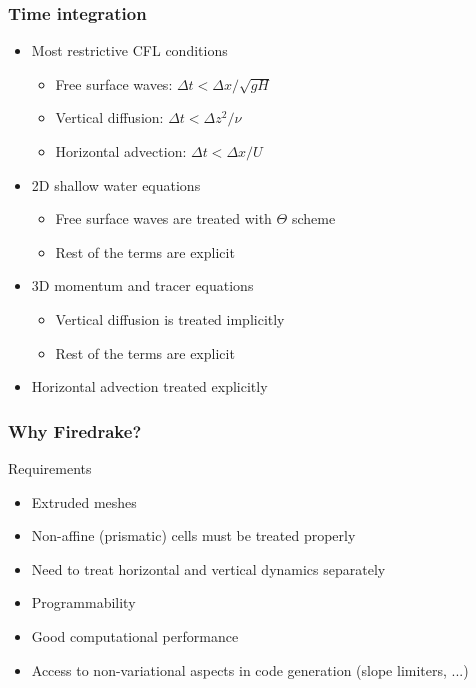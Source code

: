 \documentclass{beamer}
\begin{document}
\begin{frame}[t]
\frametitle{Time integration}
\begin{itemize}
\item Most restrictive CFL conditions
  \begin{itemize}
  \item Free surface waves: {\scriptsize $\Delta t < \Delta x / \sqrt{gH}$}
  \item Vertical diffusion: {\scriptsize $\Delta t < \Delta z^2 / \nu$}
  \item Horizontal advection: {\scriptsize $\Delta t < \Delta x / U$}
  \end{itemize}
\item<2-> 2D shallow water equations
  \begin{itemize}
  \item Free surface waves are treated with $\Theta$ scheme
  \item Rest of the terms are explicit
  \end{itemize}
\item<3-> 3D momentum and tracer equations
  \begin{itemize}
  \item Vertical diffusion is treated implicitly
  \item Rest of the terms are explicit
  \end{itemize}
\item<4-> Horizontal advection treated explicitly
\end{itemize}
\end{frame}

\begin{frame}
  \frametitle{Why Firedrake?}
  \begin{block}{Requirements}
    \begin{itemize}
    \item[\checkmark] Extruded meshes
    \item[\checkmark] Non-affine (prismatic) cells must be treated properly
    \item[\checkmark] Need to treat horizontal and vertical dynamics separately
    \item[\checkmark] Programmability
    \item[\checkmark] Good computational performance
    \item[\checkmark] Access to non-variational aspects in code generation (slope
      limiters, ...)
    \end{itemize}
  \end{block}
\end{frame}
\end{document}
